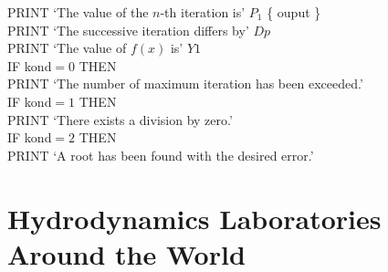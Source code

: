 \documentclass[12pt,a4paper]{report}
\begin{document}
{\newline
PRINT `The value of the $n$-th iteration is' $P_1$ \qquad \qquad \{ ouput \} \\
PRINT `The successive iteration differs by' $Dp$  \\
PRINT `The value of $f(x)$ is' $Y1$ \\
IF kond$= 0$ THEN \\
\hspace*{.2in} PRINT `The number of maximum iteration has been exceeded.' \\
IF kond$= 1$ THEN \\
\hspace*{.2in} PRINT `There exists a division by zero.' \\
IF kond$= 2$ THEN \\
\hspace*{.2in} PRINT `A root has been found with the desired error.'
}

\chapter[Hydrodynamics Laboratories]{Hydrodynamics Laboratories Around the World}
\end{document}
